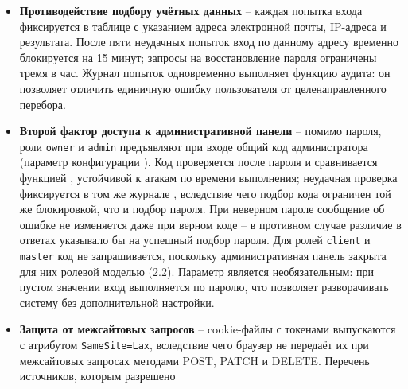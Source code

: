 \begin{itemize}
        хранятся в cookie-файлах с флагом HttpOnly, ограниченных путём
        маршрута обратного вызова, и защищают обмен кода на токен от
        подмены и от межсайтовой подделки запроса. Учётная запись,
        созданная таким способом, не содержит пароля вовсе: поле
        \texttt{password\_hash} допускает значение \texttt{NULL}, а
        связь с внешней учётной записью хранится в поле
        \texttt{vk\_user\_id}. Для ролей \texttt{owner} и
        \texttt{admin} этот способ входа отключается, если задан код
        администратора: в потоке OAuth предъявить его негде, и такой вход
        обходил бы второй фактор.
  \item \textbf{Противодействие подбору учётных данных} -- каждая
        попытка входа фиксируется в таблице  с
        указанием адреса электронной почты, IP-адреса и результата.
        После пяти неудачных попыток вход по данному адресу временно
        блокируется на 15 минут; запросы на восстановление пароля
        ограничены тремя в час. Журнал попыток одновременно выполняет
        функцию аудита: он позволяет отличить единичную ошибку
        пользователя от целенаправленного перебора.
  \item \textbf{Второй фактор доступа к административной панели} --
        помимо пароля, роли \texttt{owner} и \texttt{admin} предъявляют
        при входе общий код администратора (параметр конфигурации
        ). Код проверяется после пароля и
        сравнивается функцией ,
        устойчивой к атакам по времени выполнения; неудачная проверка
        фиксируется в том же журнале , вследствие
        чего подбор кода ограничен той же блокировкой, что и подбор
        пароля. При неверном пароле сообщение об ошибке не изменяется
        даже при верном коде -- в противном случае различие в ответах
        указывало бы на успешный подбор пароля. Для ролей
        \texttt{client} и \texttt{master} код не запрашивается,
        поскольку административная панель закрыта для них ролевой
        моделью (2.2). Параметр является необязательным: при пустом
        значении вход выполняется по паролю, что позволяет разворачивать
        систему без дополнительной настройки.
  \item \textbf{Защита от межсайтовых запросов} -- cookie-файлы с
        токенами выпускаются с атрибутом \texttt{SameSite=Lax}, вследствие
        чего браузер не передаёт их при межсайтовых запросах методами
        POST, PATCH и DELETE. Перечень источников, которым разрешено

\end{itemize}
